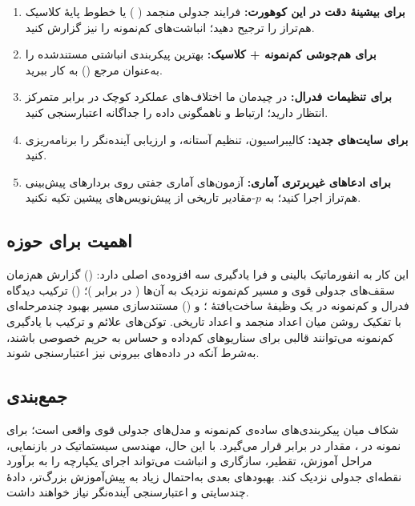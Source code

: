 \begin{enumerate}
\item \textbf{برای بیشینۀ دقت در این کوهورت:} فرایند جدولی  منجمد ( \textbf{}) یا خطوط پایۀ کلاسیک هم‌تراز را ترجیح دهید؛ انباشت‌های کم‌نمونه را نیز گزارش کنید.
\item \textbf{برای هم‌جوشی کم‌نمونه + کلاسیک:} بهترین پیکربندی انباشتی مستندشده را به‌عنوان مرجع (\textbf{}) به کار ببرید.
\item \textbf{برای تنظیمات فدرال:} در چیدمان ما اختلاف‌های عملکرد کوچک در برابر متمرکز انتظار دارید؛ ارتباط و ناهمگونی داده را جداگانه اعتبارسنجی کنید.
\item \textbf{برای سایت‌های جدید:} کالیبراسیون، تنظیم آستانه، و ارزیابی آینده‌نگر را برنامه‌ریزی کنید.
\item \textbf{برای ادعاهای غیربرتری آماری:} آزمون‌های آماری جفتی روی بردارهای پیش‌بینی هم‌تراز اجرا کنید؛ به $p$-مقادیر تاریخی از پیش‌نویس‌های پیشین تکیه نکنید.
\end{enumerate}

\subsection{اهمیت برای حوزه}

این کار به انفورماتیک بالینی و فرا یادگیری سه افزوده‌ی اصلی دارد: () گزارش هم‌زمان سقف‌های جدولی قوی و مسیر کم‌نمونه نزدیک به آن‌ها (\textbf{} در برابر \textbf{})؛ () ترکیب دیدگاه فدرال و کم‌نمونه در یک وظیفۀ ساخت‌یافتۀ ؛ و () مستندسازی مسیر بهبود چندمرحله‌ای  با تفکیک روشن میان اعداد منجمد و اعداد تاریخی. توکن‌های علائم و ترکیب  با یادگیری کم‌نمونه می‌توانند قالبی برای سناریوهای کم‌داده و حساس به حریم خصوصی باشند، به‌شرط آنکه در داده‌های بیرونی نیز اعتبارسنجی شوند.

\subsection{جمع‌بندی}

شکاف میان پیکربندی‌های ساده‌ی کم‌نمونه و مدل‌های جدولی قوی واقعی است؛ برای نمونه در ، مقدار \textbf{} در برابر \textbf{} قرار می‌گیرد. با این حال، مهندسی سیستماتیک در بازنمایی، مراحل آموزش، تقطیر، سازگاری و انباشت می‌تواند اجرای یکپارچه را به برآورد نقطه‌ای  جدولی نزدیک کند. بهبودهای بعدی به‌احتمال زیاد به پیش‌آموزش بزرگ‌تر، دادۀ چندسایتی و اعتبارسنجی آینده‌نگر نیاز خواهند داشت.

